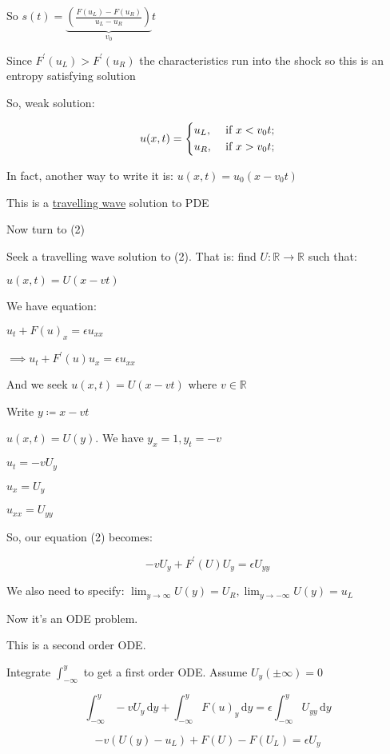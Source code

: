 \documentclass{article}
\theoremstyle{definition}
\begin{document}
So \(s(t) = \underbrace{(\frac{F(u_L)-F(u_R)}{u_L - u_R})}_{v_0}t\) 

Since \(F^{\prime} (u_L) > F^{\prime} (u_R)\) the characteristics run into the shock so this is an entropy satisfying solution

So, weak solution:

\[
    u(x,t) = \begin{dcases}
        u_L, &\text{ if } x < v_0 t ;\\
        u_R, &\text{ if } x > v_0 t ;
    \end{dcases}
\]

In fact, another way to write it is: \(u(x,t) = u_0(x - v_0t)\) 

This is a \underline{travelling wave} solution to PDE

Now turn to (2)

Seek a travelling wave solution to (2). That is: find \(U:\mathbb{R} \to \mathbb{R}\) such that:

\(u(x,t)=U(x - vt)\) 

We have equation:

\(u_t + F(u)_x = \epsilon u_{x x}\)

\(\implies u_t + F^{\prime} (u) u_x = \epsilon u_{x x}\) 

And we seek \(u(x,t)=U(x - vt)\) where \(v\in\mathbb{R}\) 

Write \(y\coloneqq x - vt\)

\(u(x,t)=U(y)\). We have \(y_x = 1, y_t = -v\) 

\(u_t = -v U_y\)

\(u_x = U_y\) 

\(u_{x x} = U_{y y}\) 

So, our equation (2) becomes:

\[
    - v U_y + F^{\prime} (U) U_y = \epsilon U_{y y}
\]

We also need to specify: \(\lim_{y \to \infty} U(y) = U_R, \lim_{y \to -\infty} U(y) = u_L\) 

Now it's an ODE problem.

This is a second order ODE.

Integrate \(\int_{-\infty}^y\) to get a first order ODE. Assume \(U_y (\pm \infty)=0\) 

\[
    \int_{-\infty}^{y} - v U_y\,\mathrm{d}y + \int_{-\infty}^{y} F(u)_y \,\mathrm{d}y = \epsilon \int_{-\infty}^{y} U_{y y} \,\mathrm{d}y  
\]

\[
    - v (U(y) - u_L) + F(U) - F(U_L) = \epsilon U_y
\]
\end{document}

